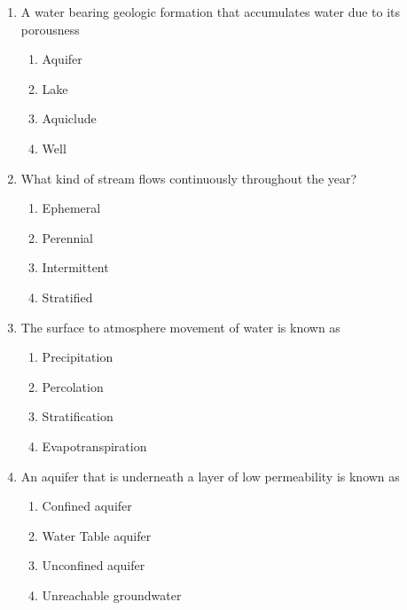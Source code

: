 \begin{enumerate}
\item A water bearing geologic formation that accumulates water due to its porousness\\
\begin{enumerate}
\item Aquifer\\
\item Lake\\
\item Aquiclude\\
\item Well
\end{enumerate}

\item  What kind of stream flows continuously throughout the year?\\
\begin{enumerate}
\item Ephemeral\\
\item Perennial\\
\item Intermittent\\
\item Stratified
\end{enumerate}

\item  The surface to atmosphere movement of water is known as\\
\begin{enumerate}
\item Precipitation\\
\item Percolation\\
\item Stratification\\
\item Evapotranspiration
\end{enumerate}

\item  An aquifer that is underneath a layer of low permeability is known as\\
\begin{enumerate}
\item Confined aquifer\\
\item Water Table aquifer\\
\item Unconfined aquifer\\
\item Unreachable groundwater
\end{enumerate}


\end{enumerate}

